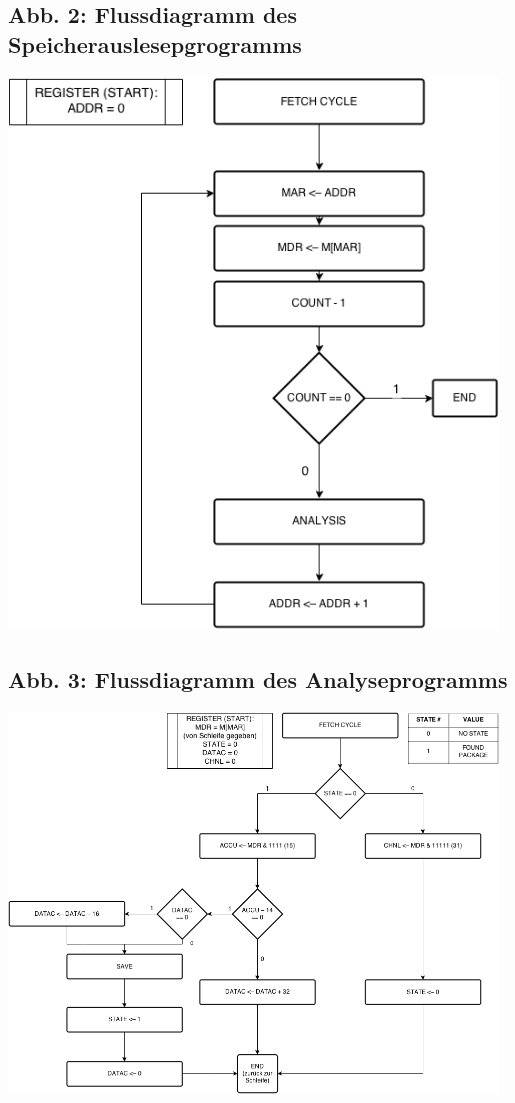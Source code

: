 \documentclass[12pt,titlepage]{article}
\begin{document}
\subsection{Abb. 2: Flussdiagramm des Speicherauslesepgrogramms}
\includegraphics[width=13cm]{readFromMemory.png}

\subsection{Abb. 3: Flussdiagramm des Analyseprogramms}
\includegraphics[width=13cm]{analyseData.png}
\end{document}
